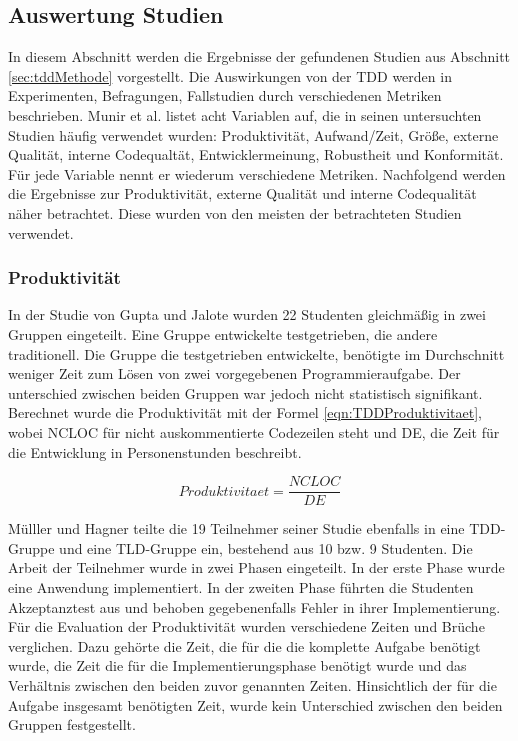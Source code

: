 \subsection{Auswertung Studien} \label{sec:tddAuswertungStudien}

In diesem Abschnitt werden die Ergebnisse der gefundenen Studien aus Abschnitt \ref{sec:tddMethode} vorgestellt. Die Auswirkungen von der TDD werden in Experimenten, Befragungen, Fallstudien durch verschiedenen Metriken beschrieben. Munir et al. \cite{Munir2014ConsideringReview} listet acht Variablen auf, die in seinen untersuchten Studien häufig verwendet wurden: Produktivität, Aufwand/Zeit, Größe, externe Qualität, interne Codequaltät, Entwicklermeinung, Robustheit und  Konformität. Für jede Variable nennt er wiederum verschiedene Metriken. Nachfolgend werden die Ergebnisse zur Produktivität, externe Qualität und interne Codequalität näher betrachtet. Diese wurden von den meisten der betrachteten Studien verwendet.

\subsubsection{Produktivität} In der Studie \cite{Gupta2007AnDevelopment} von Gupta und Jalote wurden 22 Studenten gleichmäßig in zwei Gruppen eingeteilt. Eine Gruppe entwickelte testgetrieben, die andere traditionell. Die Gruppe die testgetrieben entwickelte, benötigte im Durchschnitt weniger Zeit zum Lösen von zwei vorgegebenen Programmieraufgabe. Der unterschied zwischen beiden Gruppen war jedoch nicht statistisch signifikant. Berechnet wurde die Produktivität mit der Formel \ref{eqn:TDDProduktivitaet}, wobei NCLOC für nicht auskommentierte Codezeilen steht und DE, die Zeit für die Entwicklung in Personenstunden beschreibt.

\begin{equation}
\label{eqn:TDDProduktivitaet}
Produktivitaet = \frac{NCLOC}{DE}
\end{equation}

Mülller und Hagner \cite{Muller2002ExperimentProgramming} teilte die 19 Teilnehmer seiner Studie ebenfalls in eine TDD-Gruppe und eine TLD-Gruppe ein, bestehend aus 10 bzw. 9 Studenten. Die Arbeit der Teilnehmer wurde in zwei Phasen eingeteilt. In der erste Phase wurde eine Anwendung implementiert. In der zweiten Phase führten die Studenten Akzeptanztest aus und behoben gegebenenfalls Fehler in ihrer Implementierung. Für die Evaluation der Produktivität wurden verschiedene Zeiten und Brüche verglichen. Dazu gehörte die Zeit, die für die die komplette Aufgabe benötigt wurde, die Zeit die für die Implementierungsphase benötigt wurde und das Verhältnis zwischen den beiden zuvor genannten Zeiten. Hinsichtlich der für die Aufgabe insgesamt benötigten Zeit, wurde kein Unterschied zwischen den beiden Gruppen festgestellt.

